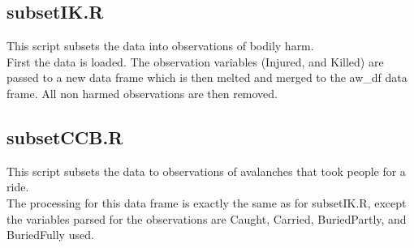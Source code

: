 \documentclass[12pt]{article}
\begin{document}
\subsection*{subsetIK.R}
This script subsets the data into observations of bodily harm.\\

First the data is loaded.  The observation variables (Injured, and Killed) are passed to a new data frame which is then melted and merged to the aw\_df data frame.  All non harmed observations are then removed.

\subsection*{subsetCCB.R}
This script subsets the data to observations of avalanches that took people for a ride.\\

The processing for this data frame is exactly the same as for subsetIK.R, except the variables parsed for the observations are Caught, Carried, BuriedPartly, and BuriedFully used.
\end{document}

